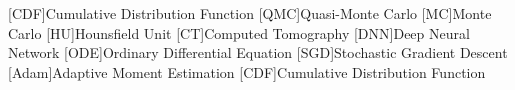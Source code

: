 [CDF]{Cumulative Distribution Function}
[QMC]{Quasi-Monte Carlo}
[MC]{Monte Carlo}
[HU]{Hounsfield Unit}
[CT]{Computed Tomography}
[DNN]{Deep Neural Network}
[ODE]{Ordinary Differential Equation}
[SGD]{Stochastic Gradient Descent}
[Adam]{Adaptive Moment Estimation}
[CDF]{Cumulative Distribution Function}
